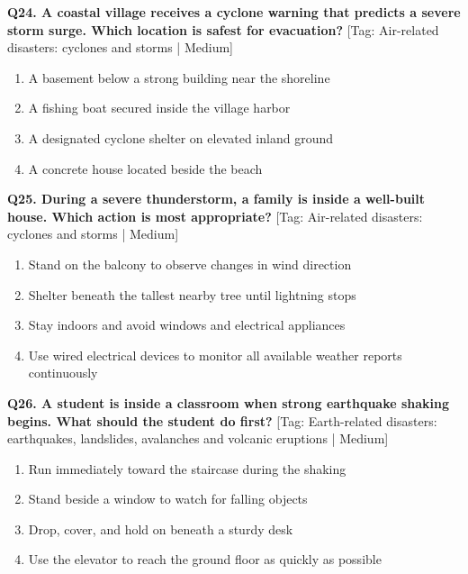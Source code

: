 \noindent\textbf{Q24. A coastal village receives a cyclone warning that predicts a severe storm surge. Which location is safest for evacuation?} \hfill [Tag: Air-related disasters: cyclones and storms | Medium]
\begin{enumerate}[label=(\alph*),topsep=2pt,itemsep=1pt,partopsep=0pt,parsep=0pt]
    \item {A basement below a strong building near the shoreline}
    \item {A fishing boat secured inside the village harbor}
    \item {A designated cyclone shelter on elevated inland ground}
    \item {A concrete house located beside the beach}
\end{enumerate}
\vspace{2mm}

\noindent\textbf{Q25. During a severe thunderstorm, a family is inside a well-built house. Which action is most appropriate?} \hfill [Tag: Air-related disasters: cyclones and storms | Medium]
\begin{enumerate}[label=(\alph*),topsep=2pt,itemsep=1pt,partopsep=0pt,parsep=0pt]
    \item {Stand on the balcony to observe changes in wind direction}
    \item {Shelter beneath the tallest nearby tree until lightning stops}
    \item {Stay indoors and avoid windows and electrical appliances}
    \item {Use wired electrical devices to monitor all available weather reports continuously}
\end{enumerate}
\vspace{2mm}

\noindent\textbf{Q26. A student is inside a classroom when strong earthquake shaking begins. What should the student do first?} \hfill [Tag: Earth-related disasters: earthquakes, landslides, avalanches and volcanic eruptions | Medium]
\begin{enumerate}[label=(\alph*),topsep=2pt,itemsep=1pt,partopsep=0pt,parsep=0pt]
    \item {Run immediately toward the staircase during the shaking}
    \item {Stand beside a window to watch for falling objects}
    \item {Drop, cover, and hold on beneath a sturdy desk}
    \item {Use the elevator to reach the ground floor as quickly as possible}
\end{enumerate}
\vspace{2mm}

